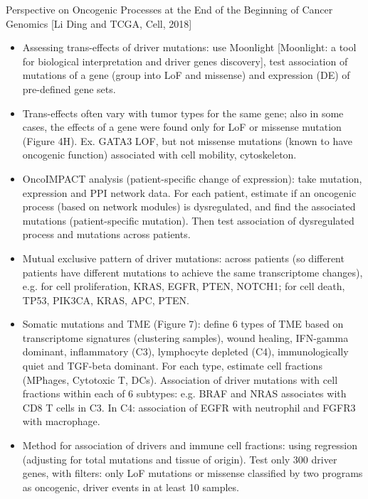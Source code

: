 \documentclass{report}
\begin{document}
Perspective on Oncogenic Processes at the End of the Beginning of Cancer Genomics [Li Ding and TCGA, Cell, 2018]
\begin{itemize}
	
	\item Assessing trans-effects of driver mutations: use Moonlight [Moonlight: a tool for biological interpretation and driver genes discovery], test association of mutations of a gene (group into LoF and missense) and expression (DE) of pre-defined gene sets. 
	
	\item Trans-effects often vary with tumor types for the same gene; also in some cases, the effects of a gene were found only for LoF or missense mutation (Figure 4H). Ex. GATA3 LOF, but not missense mutations (known to have oncogenic function) associated with cell mobility, cytoskeleton. 
	
	\item OncoIMPACT analysis (patient-specific change of expression): take mutation, expression and PPI network data. For each patient, estimate if an oncogenic process (based on network modules) is dysregulated, and find the associated mutations (patient-specific mutation). Then test association of dysregulated process and mutations across patients. 
	
	\item Mutual exclusive pattern of driver mutations: across patients (so different patients have different mutations to achieve the same transcriptome changes), e.g. for cell proliferation, KRAS, EGFR, PTEN, NOTCH1; for cell death, TP53, PIK3CA, KRAS, APC, PTEN. 
	
	\item Somatic mutations and TME (Figure 7): define 6 types of TME based on transcriptome signatures (clustering samples), wound healing, IFN-gamma dominant, inflammatory (C3), lymphocyte depleted (C4), immunologically quiet and TGF-beta dominant. For each type, estimate cell fractions (MPhages, Cytotoxic T, DCs). Association of driver mutations with cell fractions within each of 6 subtypes: e.g. BRAF and NRAS associates with CD8 T cells in C3. In C4: association of EGFR with neutrophil and FGFR3 with macrophage.  
	
	\item Method for association of drivers and immune cell fractions: using regression (adjusting for total mutations and tissue of origin). Test only 300 driver genes, with filters: only LoF mutations or missense classified by two programs as oncogenic, driver events in at least 10 samples. 
	

\end{itemize}
\end{document}
